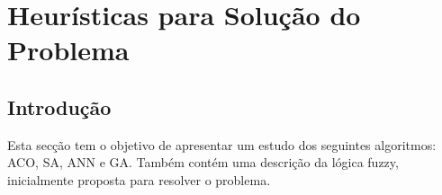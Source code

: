 \chapter{Heurísticas para Solução do Problema}\label{cap:heuristicas}

\section{Introdução}

Esta secção tem o objetivo de apresentar um estudo dos seguintes algoritmos:
ACO, SA, ANN e GA\@. Também contém uma descrição da lógica fuzzy, inicialmente
proposta para resolver o problema.



